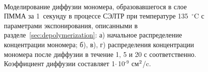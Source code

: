 \begin{figure}[H]
\begin{center}
		\vspace{-4em}  \vspace{2em} \\
	\end{center}
	\vspace{-1.5em}
	\caption{Моделирование диффузии мономера, образовавшегося в слое ПММА за 1~секунду в процессе СЭЛТР при температуре 135~$^\circ$C с параметрами экспонирования, описанными в разделе~\ref{sec:depolymerization}: а) начальное распределение концентрации мономера; б), в), г) распределения концентрации мономера после диффузии в течение 1, 5 и 20 с соответственно. Коэффициент диффузии составляет 1\:$\cdot$\,10$^\text{-9}$ см$^\text{2}$/c.}
	\label{fig:diffusion_10s}
\end{figure}
